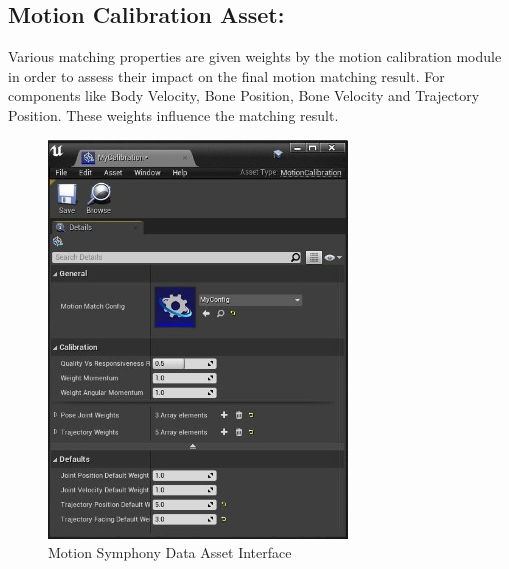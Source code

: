 \documentclass[12pt]{book}
\begin{document}
\subsection{Motion Calibration Asset:}
Various matching properties are given weights by the motion calibration module in order to
assess their impact on the final motion matching result. For components like Body Velocity,
Bone Position, Bone Velocity and Trajectory Position.
These weights influence the matching result.
\begin{figure}[!h]
    \centering
    \includegraphics[scale=0.5]{./Figures/Images/Motion Symphony/MMCalibrationDetails.jpeg}
    \caption{Motion Symphony Data Asset Interface}
    \label{Motion Symphony Data Asset Interface}
\end{figure}

\newpage
\end{document}
